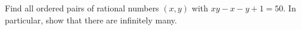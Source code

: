 Find all ordered pairs of rational numbers $(x,y)$ with $xy-x-y+1=50$. In particular, show that there are infinitely many.
